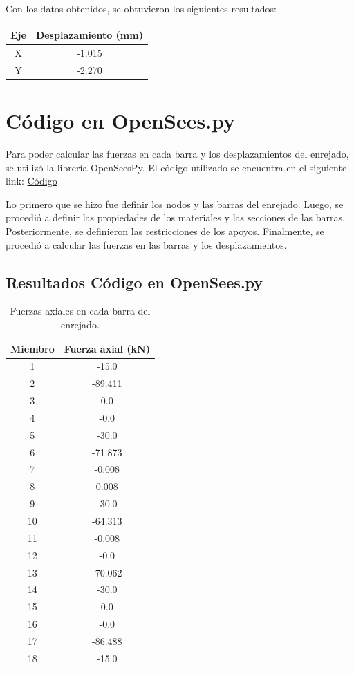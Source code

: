 \documentclass{article}  %
\begin{document}
Con los datos obtenidos, se obtuvieron los siguientes resultados:

\begin{table}[h]
  \centering
  
  \begin{tabular}{cc}
    \hline
    \textbf{Eje} & \textbf{Desplazamiento (mm)} \\
    \hline
    X & -1.015 \\
    Y & -2.270 \\
    \hline
  \end{tabular}
\end{table}

\newpage
\section{Código en OpenSees.py}
Para poder calcular las fuerzas en cada barra y los desplazamientos del enrejado, se utilizó la librería OpenSeesPy. El código utilizado se encuentra en el siguiente link: \href{https://github.com/berckanala/P2E0_MCOC/tree/main/c%C3%B3digo}{Código}

Lo primero que se hizo fue definir los nodos y las barras del enrejado. Luego, se procedió a definir las propiedades de los materiales y las secciones de las barras. Posteriormente, se definieron las restricciones de los apoyos. Finalmente, se procedió a calcular las fuerzas en las barras y los desplazamientos.

\subsection{Resultados Código en OpenSees.py}
\begin{table}[h!]
  \centering
  \begin{tabular}{|c|c|}
  \hline
  \textbf{Miembro} & \textbf{Fuerza axial (kN)} \\
  \hline
  1  & -15.0   \\
  2  & -89.411 \\
  3  & 0.0     \\
  4  & -0.0    \\
  5  & -30.0   \\
  6  & -71.873 \\
  7  & -0.008  \\
  8  & 0.008   \\
  9  & -30.0   \\
  10 & -64.313 \\
  11 & -0.008  \\
  12 & -0.0    \\
  13 & -70.062 \\
  14 & -30.0   \\
  15 & 0.0     \\
  16 & -0.0    \\
  17 & -86.488 \\
  18 & -15.0   \\
  \hline
  \end{tabular}
  \caption{Fuerzas axiales en cada barra del enrejado.}
  \label{tab:2}
\end{table}
\end{document}

